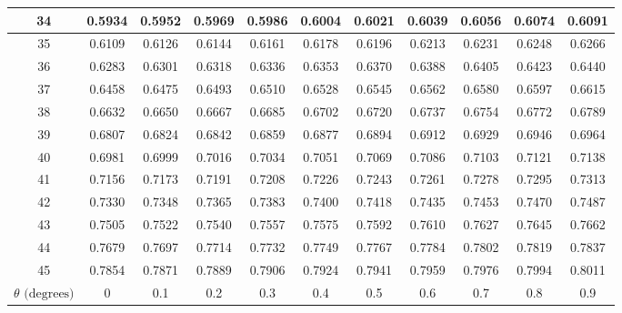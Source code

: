 {\begin{tabular}{|c|cccccccccc|}
34 & 0.5934 & 0.5952 & 0.5969 & 0.5986 & 0.6004 & 0.6021 & 0.6039 & 0.6056 & 0.6074 & 0.6091 \\
\hline
35 & 0.6109 & 0.6126 & 0.6144 & 0.6161 & 0.6178 & 0.6196 & 0.6213 & 0.6231 & 0.6248 & 0.6266 \\
36 & 0.6283 & 0.6301 & 0.6318 & 0.6336 & 0.6353 & 0.6370 & 0.6388 & 0.6405 & 0.6423 & 0.6440 \\
37 & 0.6458 & 0.6475 & 0.6493 & 0.6510 & 0.6528 & 0.6545 & 0.6562 & 0.6580 & 0.6597 & 0.6615 \\
38 & 0.6632 & 0.6650 & 0.6667 & 0.6685 & 0.6702 & 0.6720 & 0.6737 & 0.6754 & 0.6772 & 0.6789 \\
39 & 0.6807 & 0.6824 & 0.6842 & 0.6859 & 0.6877 & 0.6894 & 0.6912 & 0.6929 & 0.6946 & 0.6964 \\
\hline
40 & 0.6981 & 0.6999 & 0.7016 & 0.7034 & 0.7051 & 0.7069 & 0.7086 & 0.7103 & 0.7121 & 0.7138 \\
41 & 0.7156 & 0.7173 & 0.7191 & 0.7208 & 0.7226 & 0.7243 & 0.7261 & 0.7278 & 0.7295 & 0.7313 \\
42 & 0.7330 & 0.7348 & 0.7365 & 0.7383 & 0.7400 & 0.7418 & 0.7435 & 0.7453 & 0.7470 & 0.7487 \\
43 & 0.7505 & 0.7522 & 0.7540 & 0.7557 & 0.7575 & 0.7592 & 0.7610 & 0.7627 & 0.7645 & 0.7662 \\
44 & 0.7679 & 0.7697 & 0.7714 & 0.7732 & 0.7749 & 0.7767 & 0.7784 & 0.7802 & 0.7819 & 0.7837 \\
\hline
45 & 0.7854 & 0.7871 & 0.7889 & 0.7906 & 0.7924 & 0.7941 & 0.7959 & 0.7976 & 0.7994 & 0.8011 \\
\hline
$\theta\text{ (degrees)}$ & 0 & 0.1 & 0.2 & 0.3 & 0.4 & 0.5 & 0.6 & 0.7 & 0.8 & 0.9 \\ \hline
\end{tabular}\par}
\clearpage

